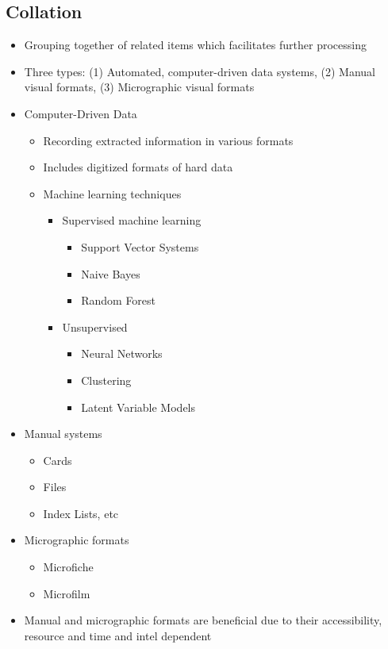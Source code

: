 \documentclass[11pt]{article}
\begin{document}
\subsection{Collation}
\label{sec:orgb6aba3f}
\begin{itemize}
\item Grouping together of related items which facilitates further processing
\item Three types: (1) Automated, computer-driven data systems, (2) Manual visual formats, (3) Micrographic visual formats
\item Computer-Driven Data
\begin{itemize}
\item Recording extracted information in various formats
\item Includes digitized formats of hard data
\item Machine learning techniques
\begin{itemize}
\item Supervised machine learning
\begin{itemize}
\item Support Vector Systems
\item Naive Bayes
\item Random Forest
\end{itemize}
\item Unsupervised
\begin{itemize}
\item Neural Networks
\item Clustering
\item Latent Variable Models
\end{itemize}
\end{itemize}
\end{itemize}
\item Manual systems
\begin{itemize}
\item Cards
\item Files
\item Index Lists, etc
\end{itemize}
\item Micrographic formats
\begin{itemize}
\item Microfiche
\item Microfilm
\end{itemize}
\item Manual and micrographic formats are beneficial due to their accessibility, resource and time and intel dependent
\end{itemize}
\end{document}
